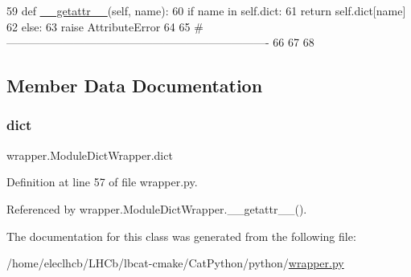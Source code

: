 \begin{DoxyCode}
59     \textcolor{keyword}{def }\hyperlink{classwrapper_1_1ModuleDictWrapper_adae96be13e70d38f587247c42a1a69a4}{\_\_getattr\_\_}(self, name):
60         \textcolor{keywordflow}{if} name \textcolor{keywordflow}{in} self.dict:
61             \textcolor{keywordflow}{return} self.dict[name]
62         \textcolor{keywordflow}{else}:
63             \textcolor{keywordflow}{raise} AttributeError
64 
65 \textcolor{comment}{#----------------------------------------------------------------------}
66 
67 
68 \end{DoxyCode}


\subsection{Member Data Documentation}
\mbox{\label{classwrapper_1_1ModuleDictWrapper_a5e330c40edd8bccfb13d141ebb174076}} 
\subsubsection{\texorpdfstring{dict}{dict}}
{\footnotesize\ttfamily wrapper.\+Module\+Dict\+Wrapper.\+dict}



Definition at line 57 of file wrapper.\+py.



Referenced by wrapper.\+Module\+Dict\+Wrapper.\+\_\+\+\_\+getattr\+\_\+\+\_\+().



The documentation for this class was generated from the following file\+:\begin{DoxyCompactItemize}
\item 
/home/eleclhcb/\+L\+H\+Cb/lbcat-\/cmake/\+Cat\+Python/python/\hyperlink{wrapper_8py}{wrapper.\+py}\end{DoxyCompactItemize}
